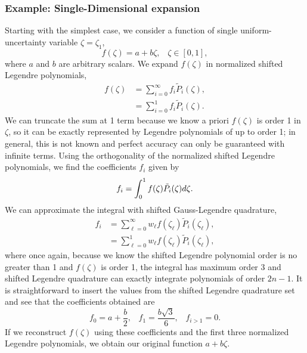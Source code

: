 \subsubsection{Example: Single-Dimensional expansion}
Starting with the simplest case, we consider a function of single uniform-uncertainty variable $\zeta=\zeta_1$,
\begin{equation}
f(\zeta)=a+b\zeta, \hspace{10pt}\zeta\in[0,1],
\end{equation}
where $a$ and $b$ are arbitrary scalars.  We expand $f(\zeta)$ in normalized shifted Legendre polynomials,
\begin{align}
f(\zeta)&=\sum_{i=0}^\infty f_i\tilde P_i(\zeta),\\
 &= \sum_{i=0}^1 f_i\tilde P_i(\zeta).
\end{align}
We can truncate the sum at 1 term because we know a priori $f(\zeta)$ is order 1 in $\zeta$, so it can be exactly represented by Legendre polynomials of up to order 1; in general, this is not known and perfect accuracy can only be guaranteed with infinite terms.  Using the orthogonality of the normalized shifted Legendre polynomials, we find the coefficients $f_i$ given by
\begin{equation}
f_i=\int_0^1 f(\zeta)\tilde P_i(\zeta)d\zeta.
\end{equation}
We can approximate the integral with shifted Gauss-Legendre quadrature,
\begin{align}
f_i&=\sum_{\ell=0}^\infty w_\ell f(\zeta_\ell)\tilde P_i(\zeta_\ell),\\
 &=\sum_{\ell=0}^1 w_\ell f(\zeta_\ell)\tilde P_i(\zeta_\ell),
\end{align}
where once again, because we know the shifted Legendre polynomial order is no greater than 1 and $f(\zeta)$ is order 1, the integral has maximum order 3 and shifted Legendre quadrature can exactly integrate polynomials of order $2n-1$.  It is straightforward to insert the values from the shifted Legendre quadrature set and see that the coefficients obtained are
\begin{equation}
f_0=a+\frac{b}{2},\hspace{10pt} f_1=\frac{b\sqrt{3}}{6},\hspace{10pt} f_{i>1}=0.
\end{equation}
If we reconstruct $f(\zeta)$ using these coefficients and the first three normalized Legendre polynomials, we obtain our original function $a+b\zeta$.

